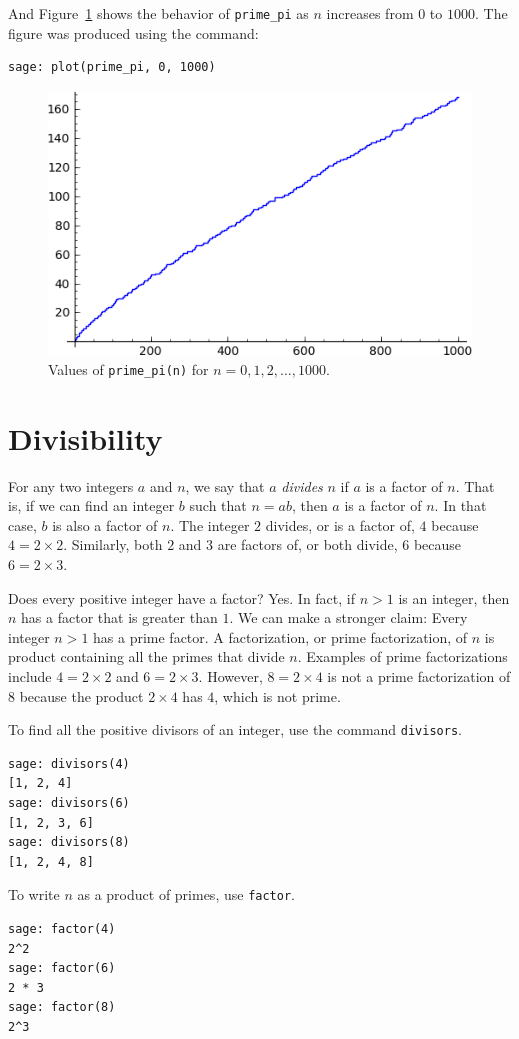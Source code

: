 %
And Figure~\ref{fig:number_theory:prime_pi_for_n_leq_1000} shows the
behavior of \verb!prime_pi! as $n$ increases from $0$ to $1000$. The
figure was produced using the command:
%
\begin{lstlisting}
sage: plot(prime_pi, 0, 1000)
\end{lstlisting}
%
\begin{figure}[!htbp]
\centering
\includegraphics[scale=0.8]{images/prime-pi-1000}
\caption{Values of \texttt{prime\_pi(n)} for $n = 0, 1, 2, \dots, 1000$.}
\label{fig:number_theory:prime_pi_for_n_leq_1000}
\end{figure}



\section{Divisibility}

For any two integers $a$ and $n$, we say that $a$ \emph{divides} $n$
if $a$ is a factor of $n$. That is, if we can find an integer $b$ such
that $n = ab$, then $a$ is a factor of $n$. In that case, $b$ is also
a factor of $n$. The integer $2$ divides, or is a factor of, $4$
because $4 = 2 \times 2$. Similarly, both $2$ and $3$ are factors of,
or both divide, $6$ because $6 = 2 \times 3$.

Does every positive integer have a factor? Yes. In fact, if $n > 1$ is
an integer, then $n$ has a factor that is greater than $1$. We can
make a stronger claim: Every integer $n > 1$ has a prime factor. A
factorization, or prime factorization, of $n$ is product containing
all the primes that divide $n$. Examples of prime factorizations
include $4 = 2 \times 2$ and $6 = 2 \times 3$. However, $8 = 2 \times 4$
is not a prime factorization of $8$ because the product $2 \times 4$
has $4$, which is not prime.

To find all the positive divisors of an integer, use the command
\verb!divisors!.
%
\begin{lstlisting}
sage: divisors(4)
[1, 2, 4]
sage: divisors(6)
[1, 2, 3, 6]
sage: divisors(8)
[1, 2, 4, 8]
\end{lstlisting}
%
To write $n$ as a product of primes, use \verb!factor!.

\begin{lstlisting}
sage: factor(4)
2^2
sage: factor(6)
2 * 3
sage: factor(8)
2^3
\end{lstlisting}
